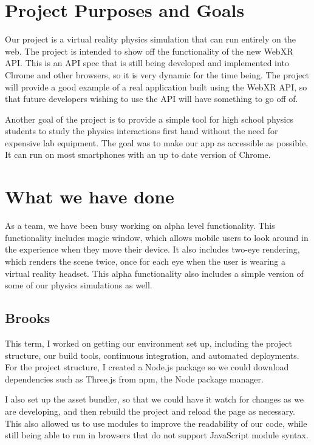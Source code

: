 \documentclass[onecolumn, draftclsnofoot,10pt, compsoc]{IEEEtran}
\begin{document}
\clearpage

\section{Project Purposes and Goals}
Our project is a virtual reality physics simulation that can run entirely on the web. The project is intended to show off the functionality of the new WebXR API. This is an API spec that is still being developed and implemented into Chrome and other browsers, so it is very dynamic for the time being. The project will provide a good example of a real application built using the WebXR API, so that future developers wishing to use the API will have something to go off of. 

Another goal of the project is to provide a simple tool for high school physics students to study the physics interactions first hand without the need for expensive lab equipment. The goal was to make our app as accessible as possible. It can run on most smartphones with an up to date version of Chrome.

\section{What we have done}
As a team, we have been busy working on alpha level functionality. This functionality includes magic window, which allows mobile users to look around in the experience when they move their device. It also includes two-eye rendering, which renders the scene twice, once for each eye when the user is wearing a virtual reality headset. This alpha functionality also includes a simple version of some of our physics simulations as well.  

\subsection{Brooks}
This term, I worked on getting our environment set up, including the project structure, our build tools, continuous integration, and automated deployments. For the project structure, I created a Node.js package so we could download dependencies such as Three.js from npm, the Node package manager. 

I also set up the asset bundler, so that we could have it watch for changes as we are developing, and then rebuild the project and reload the page as necessary. This also allowed us to use modules to improve the readability of our code, while still being able to run in browsers that do not support JavaScript module syntax. 
\end{document}
